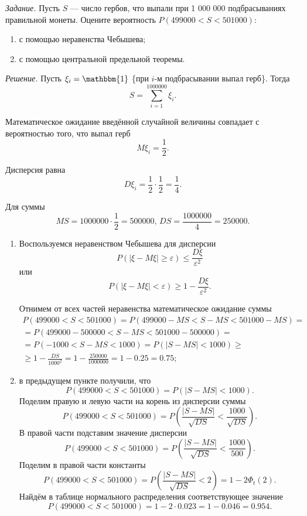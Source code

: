 \textit{Задание.}
Пусть $S$ --- число гербов, что выпали при 1 000 000 подбрасываниях правильной монеты.
Оцените вероятность $P \left( 499000 < S < 501000 \right) $:
\begin{enumerate}[label=\alph*)]
\item с помощью неравенства Чебышева;
\item с помощью центральной предельной теоремы.
\end{enumerate}

\textit{Решение.} Пусть $ \xi_i = \mathbbm{1}$ \{при $i$-м подбрасывании выпал герб\}.
Тогда
$$S =
  \sum \limits_{i = 1}^{1000000} \xi_i.$$

Математическое ожидание введённой случайной величины совпадает с вероятностью того, что выпал герб
$$M \xi_i =
  \frac{1}{2}.$$

Дисперсия равна
$$D \xi_i =
  \frac{1}{2} \cdot \frac{1}{2} =
  \frac{1}{4}.$$

Для суммы
$$MS = 1000000 \cdot \frac{1}{2} = 500000, \,
  DS = \frac{1000000}{4} = 250000.$$

\begin{enumerate}[label=\alph*)]
\item Воспользуемся неравенством Чебышева для дисперсии
$$P \left( \left| \xi - M \xi \right| \geq \varepsilon \right) \leq
  \frac{D \xi }{ \varepsilon^2}$$
или
$$P \left( \left| \xi - M \xi \right| < \varepsilon \right) \geq
  1 - \frac{D \xi }{ \varepsilon^2}.$$

Отнимем от всех частей неравенства математическое ожидание суммы
\begin{equation*}
  \begin{split}
    P \left( 499000 < S < 501000 \right) =
    P \left( 499000 - MS < S - MS < 501000 - MS \right) = \\
    = P \left( 499000 - 500000< S - MS < 501000 - 500000 \right) = \\
    = P \left( -1000 < S - MS < 1000 \right) =
    P \left( \left| S - MS \right| < 1000 \right) \geq \\
    \geq 1 - \frac{DS}{1000^2} =
    1 - \frac{250000}{1000000} =
    1 - 0.25 =
    0.75;
  \end{split}
\end{equation*}
\item в предыдущем пункте получили,
что
$$P \left( 499000 < S < 501000 \right) =
  P \left( \left| S - MS \right| < 1000 \right).$$
Поделим правую и левую части на корень из дисперсии суммы
$$P \left( 499000 < S < 501000 \right) =
  P \left( \frac{ \left| S - MS \right| }{ \sqrt{DS}} < \frac{1000}{ \sqrt{DS}} \right).$$
В правой части подставим значение дисперсии
$$P \left( 499000 < S < 501000 \right) =
  P \left( \frac{ \left| S - MS \right| }{ \sqrt{DS}} < \frac{1000}{500} \right).$$
Поделим в правой части константы
$$P \left( 499000 < S < 501000 \right) =
  P \left( \frac{ \left| S - MS \right| }{ \sqrt{DS}} < 2 \right) =
  1 - 2 \Phi_t \left( 2 \right).$$
Найдём в таблице нормального распределения соответствующее значение
$$P \left( 499000 < S < 501000 \right) =
  1 - 2 \cdot 0.023 =
  1 - 0.046 =
  0.954.$$
\end{enumerate}

